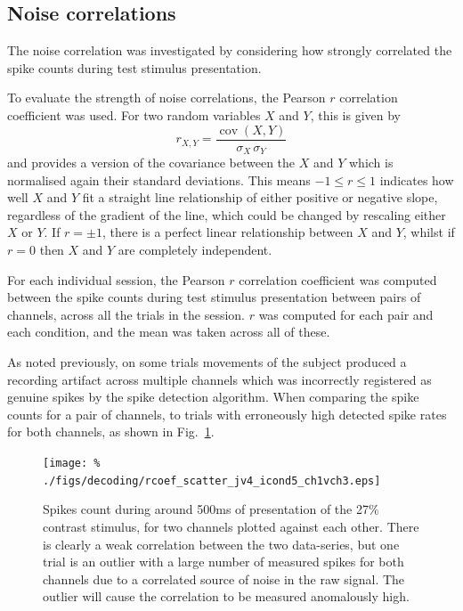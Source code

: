 \subsection{Noise correlations}
\label{sec:dec-meth-noise}

The noise correlation was investigated by considering how strongly correlated the spike counts during test stimulus presentation.

To evaluate the strength of noise correlations, the Pearson $r$ correlation coefficient was used. For two random variables $X$ and $Y$, this is given by
$$r_{X,Y} = \frac{\operatorname{cov}(X,Y)}{\sigma_X \, \sigma_Y}$$
and provides a version of the covariance between the $X$ and $Y$ which is normalised again their standard deviations.
This means $-1 \le r \le 1$ indicates how well $X$ and $Y$ fit a straight line relationship of either positive or negative slope, regardless of the gradient of the line, which could be changed by rescaling either $X$ or $Y$. If $r=\pm1$, there is a perfect linear relationship between $X$ and $Y$, whilst if $r=0$ then $X$ and $Y$ are completely independent.

For each individual session, the Pearson $r$ correlation coefficient was computed between the spike counts during test stimulus presentation between pairs of channels, across all the trials in the session. $r$ was computed for each pair and each condition, and the mean was taken across all of these.

As noted previously, on some trials movements of the subject produced a recording artifact across multiple channels which was incorrectly registered as genuine spikes by the spike detection algorithm. When comparing the spike counts for a pair of channels, to trials with erroneously high detected spike rates for both channels, as shown in Fig.~\ref{fig:noise_scatter}.

\begin{figure}[htbp]
\centering\texttt{[image: \%
./figs/decoding/rcoef\_scatter\_jv4\_icond5\_ch1vch3.eps]}
\caption{Spikes count during around 500ms of presentation of the 27\% contrast stimulus, for two channels plotted against each other. There is clearly a weak correlation between the two data-series, but one trial is an outlier with a large number of measured spikes for both channels due to a correlated source of noise in the raw signal. The outlier will cause the correlation to be measured anomalously high.}
\label{fig:noise_scatter}
\end{figure}

